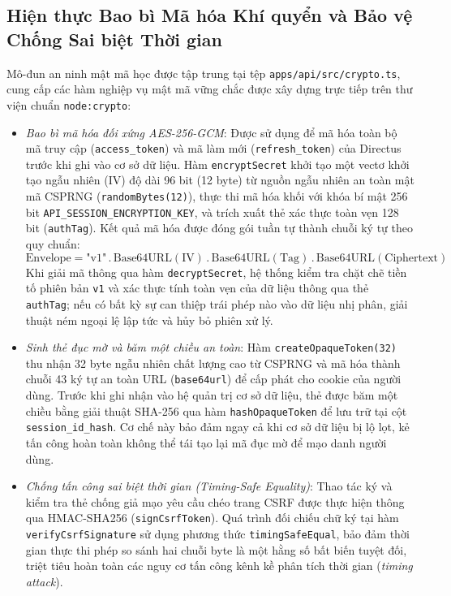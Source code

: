 \subsection{Hiện thực Bao bì Mã hóa Khí quyển và Bảo vệ Chống Sai biệt Thời gian}
Mô-đun an ninh mật mã học được tập trung tại tệp \texttt{apps/api/src/crypto.ts}, cung cấp các hàm nghiệp vụ mật mã vững chắc được xây dựng trực tiếp trên thư viện chuẩn \texttt{node:crypto}:
\begin{itemize}
    \item[-] \textit{Bao bì mã hóa đối xứng AES-256-GCM}: Được sử dụng để mã hóa toàn bộ mã truy cập (\texttt{access\_token}) và mã làm mới (\texttt{refresh\_token}) của Directus trước khi ghi vào cơ sở dữ liệu. Hàm \texttt{encryptSecret} khởi tạo một vectơ khởi tạo ngẫu nhiên (IV) độ dài 96 bit (12 byte) từ nguồn ngẫu nhiên an toàn mật mã CSPRNG (\texttt{randomBytes(12)}), thực thi mã hóa khối với khóa bí mật 256 bit \texttt{API\_SESSION\_ENCRYPTION\_KEY}, và trích xuất thẻ xác thực toàn vẹn 128 bit (\texttt{authTag}). Kết quả mã hóa được đóng gói tuần tự thành chuỗi ký tự theo quy chuẩn:
    \begin{equation}
    \label{eq:crypto_envelope_vi}
    \text{Envelope} = \text{"v1"} \,.\, \text{Base64URL}(\text{IV}) \,.\, \text{Base64URL}(\text{Tag}) \,.\, \text{Base64URL}(\text{Ciphertext})
    \end{equation}
    Khi giải mã thông qua hàm \texttt{decryptSecret}, hệ thống kiểm tra chặt chẽ tiền tố phiên bản \texttt{v1} và xác thực tính toàn vẹn của dữ liệu thông qua thẻ \texttt{authTag}; nếu có bất kỳ sự can thiệp trái phép nào vào dữ liệu nhị phân, giải thuật ném ngoại lệ lập tức và hủy bỏ phiên xử lý.
    \item[-] \textit{Sinh thẻ đục mờ và băm một chiều an toàn}: Hàm \texttt{createOpaqueToken(32)} thu nhận 32 byte ngẫu nhiên chất lượng cao từ CSPRNG và mã hóa thành chuỗi 43 ký tự an toàn URL (\texttt{base64url}) để cấp phát cho cookie của người dùng. Trước khi ghi nhận vào hệ quản trị cơ sở dữ liệu, thẻ được băm một chiều bằng giải thuật SHA-256 qua hàm \texttt{hashOpaqueToken} để lưu trữ tại cột \texttt{session\_id\_hash}. Cơ chế này bảo đảm ngay cả khi cơ sở dữ liệu bị lộ lọt, kẻ tấn công hoàn toàn không thể tái tạo lại mã đục mờ để mạo danh người dùng.
    \item[-] \textit{Chống tấn công sai biệt thời gian (Timing-Safe Equality)}: Thao tác ký và kiểm tra thẻ chống giả mạo yêu cầu chéo trang CSRF được thực hiện thông qua HMAC-SHA256 (\texttt{signCsrfToken}). Quá trình đối chiếu chữ ký tại hàm \texttt{verifyCsrfSignature} sử dụng phương thức \texttt{timingSafeEqual}, bảo đảm thời gian thực thi phép so sánh hai chuỗi byte là một hằng số bất biến tuyệt đối, triệt tiêu hoàn toàn các nguy cơ tấn công kênh kề phân tích thời gian (\textit{timing attack}).
\end{itemize}


